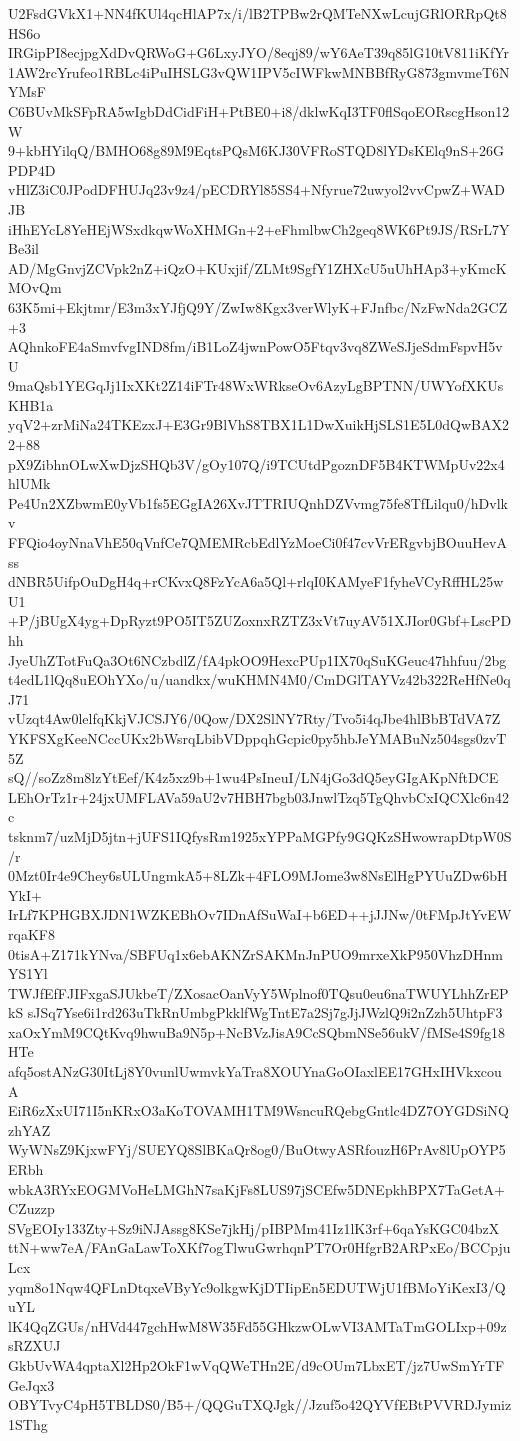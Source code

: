 U2FsdGVkX1+NN4fKUl4qcHlAP7x/i/lB2TPBw2rQMTeNXwLcujGRlORRpQt8HS6o
IRGipPI8ecjpgXdDvQRWoG+G6LxyJYO/8eqj89/wY6AeT39q85lG10tV811iKfYr
1AW2rcYrufeo1RBLc4iPuIHSLG3vQW1IPV5cIWFkwMNBBfRyG873gmvmeT6NYMsF
C6BUvMkSFpRA5wIgbDdCidFiH+PtBE0+i8/dklwKqI3TF0flSqoEORscgHson12W
9+kbHYilqQ/BMHO68g89M9EqtsPQsM6KJ30VFRoSTQD8lYDsKElq9nS+26GPDP4D
vHlZ3iC0JPodDFHUJq23v9z4/pECDRYl85SS4+Nfyrue72uwyol2vvCpwZ+WADJB
iHhEYcL8YeHEjWSxdkqwWoXHMGn+2+eFhmlbwCh2geq8WK6Pt9JS/RSrL7YBe3il
AD/MgGnvjZCVpk2nZ+iQzO+KUxjif/ZLMt9SgfY1ZHXcU5uUhHAp3+yKmcKMOvQm
63K5mi+Ekjtmr/E3m3xYJfjQ9Y/ZwIw8Kgx3verWlyK+FJnfbc/NzFwNda2GCZ+3
AQhnkoFE4aSmvfvgIND8fm/iB1LoZ4jwnPowO5Ftqv3vq8ZWeSJjeSdmFspvH5vU
9maQsb1YEGqJj1IxXKt2Z14iFTr48WxWRkseOv6AzyLgBPTNN/UWYofXKUsKHB1a
yqV2+zrMiNa24TKEzxJ+E3Gr9BlVhS8TBX1L1DwXuikHjSLS1E5L0dQwBAX22+88
pX9ZibhnOLwXwDjzSHQb3V/gOy107Q/i9TCUtdPgoznDF5B4KTWMpUv22x4hlUMk
Pe4Un2XZbwmE0yVb1fs5EGgIA26XvJTTRIUQnhDZVvmg75fe8TfLilqu0/hDvlkv
FFQio4oyNnaVhE50qVnfCe7QMEMRcbEdlYzMoeCi0f47cvVrERgvbjBOuuHevAss
dNBR5UifpOuDgH4q+rCKvxQ8FzYcA6a5Ql+rlqI0KAMyeF1fyheVCyRffHL25wU1
+P/jBUgX4yg+DpRyzt9PO5IT5ZUZoxnxRZTZ3xVt7uyAV51XJIor0Gbf+LscPDhh
JyeUhZTotFuQa3Ot6NCzbdlZ/fA4pkOO9HexcPUp1IX70qSuKGeuc47hhfuu/2bg
t4edL1lQq8uEOhYXo/u/uandkx/wuKHMN4M0/CmDGlTAYVz42b322ReHfNe0qJ71
vUzqt4Aw0lelfqKkjVJCSJY6/0Qow/DX2SlNY7Rty/Tvo5i4qJbe4hlBbBTdVA7Z
YKFSXgKeeNCccUKx2bWsrqLbibVDppqhGcpic0py5hbJeYMABuNz504sgs0zvT5Z
sQ//soZz8m8lzYtEef/K4z5xz9b+1wu4PsIneuI/LN4jGo3dQ5eyGIgAKpNftDCE
LEhOrTz1r+24jxUMFLAVa59aU2v7HBH7bgb03JnwlTzq5TgQhvbCxIQCXlc6n42c
tsknm7/uzMjD5jtn+jUFS1IQfysRm1925xYPPaMGPfy9GQKzSHwowrapDtpW0S/r
0Mzt0Ir4e9Chey6sULUngmkA5+8LZk+4FLO9MJome3w8NsElHgPYUuZDw6bHYkI+
IrLf7KPHGBXJDN1WZKEBhOv7IDnAfSuWaI+b6ED++jJJNw/0tFMpJtYvEWrqaKF8
0tisA+Z171kYNva/SBFUq1x6ebAKNZrSAKMnJnPUO9mrxeXkP950VhzDHnmYS1Yl
TWJfEfFJIFxgaSJUkbeT/ZXosacOanVyY5Wplnof0TQsu0eu6naTWUYLhhZrEPkS
sJSq7Yse6i1rd263uTkRnUmbgPkklfWgTntE7a2Sj7gJjJWzlQ9i2nZzh5UhtpF3
xaOxYmM9CQtKvq9hwuBa9N5p+NcBVzJisA9CcSQbmNSe56ukV/fMSe4S9fg18HTe
afq5ostANzG30ItLj8Y0vunlUwmvkYaTra8XOUYnaGoOIaxlEE17GHxIHVkxcouA
EiR6zXxUI71I5nKRxO3aKoTOVAMH1TM9WsncuRQebgGntlc4DZ7OYGDSiNQzhYAZ
WyWNsZ9KjxwFYj/SUEYQ8SlBKaQr8og0/BuOtwyASRfouzH6PrAv8lUpOYP5ERbh
wbkA3RYxEOGMVoHeLMGhN7saKjFs8LUS97jSCEfw5DNEpkhBPX7TaGetA+CZuzzp
SVgEOIy133Zty+Sz9iNJAssg8KSe7jkHj/pIBPMm41Iz1lK3rf+6qaYsKGC04bzX
ttN+ww7eA/FAnGaLawToXKf7ogTlwuGwrhqnPT7Or0HfgrB2ARPxEo/BCCpjuLcx
yqm8o1Nqw4QFLnDtqxeVByYc9olkgwKjDTIipEn5EDUTWjU1fBMoYiKexI3/QuYL
lK4QqZGUs/nHVd447gchHwM8W35Fd55GHkzwOLwVI3AMTaTmGOLIxp+09zsRZXUJ
GkbUvWA4qptaXl2Hp2OkF1wVqQWeTHn2E/d9cOUm7LbxET/jz7UwSmYrTFGeJqx3
OBYTvyC4pH5TBLDS0/B5+/QQGuTXQJgk//Jzuf5o42QYVfEBtPVVRDJymiz1SThg
